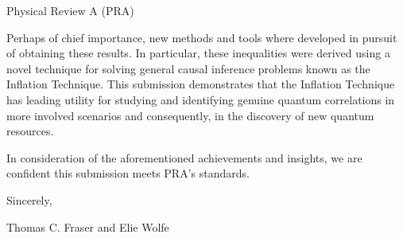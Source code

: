 \documentclass[12pt]{letter}
\begin{document}
\begin{letter}{Physical Review A (PRA)}
{%

Perhaps of chief importance, new methods and tools where developed in pursuit of obtaining these results. In particular, these inequalities were derived using a novel technique for solving general causal inference problems known as the Inflation Technique. This submission demonstrates that the Inflation Technique has leading utility for studying and identifying genuine quantum correlations in more involved scenarios and consequently, in the discovery of new quantum resources.

In consideration of the aforementioned achievements and insights, we are confident this submission meets PRA's standards.

Sincerely,

Thomas C. Fraser and Elie Wolfe
}
\end{letter}
\end{document}
